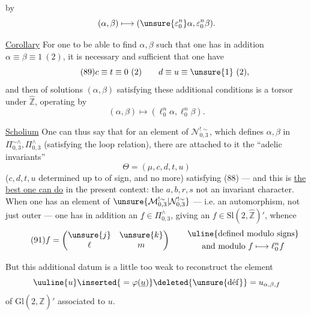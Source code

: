

by
\[
 (\alpha,\beta)\longmapsto
 (\unsure{\varepsilon_0^n}\alpha,\varepsilon_0^n\beta).
\]

\uline{Corollary} For one to be able to find $\alpha,\beta$ such that one has in addition $\alpha\equiv\beta\equiv1\ (2)$, it is necessary and sufficient that one have
\[
\tag{89}
 c\equiv t\equiv0\ (2)\qquad d\equiv u\equiv\unsure{1}\ (2),
\]
and then  of solutions $(\alpha,\beta)$ satisfying these additional conditions is a torsor under $\widehat{\mathbb Z}$, operating by
\[
 (\alpha,\beta)\longmapsto(\ell_0^n\alpha,\ell_0^n\beta).
\]

\uline{Scholium} One can thus say that for an element  of $\mathcal N_{0,3}^{!\sim}$, which defines  $\alpha,\beta$ in $\Pi_{0,3}^{\sim\wedge},\Pi_{0,3}^{\wedge}$  (satisfying the loop relation), there are attached to it the ``adelic invariants'' 
\[
\tag{90}
 \Theta=(\mu,c,d,t,u)
\]
($c,d,t,u$ determined up to  of sign, and no more) satisfying (88) --- and this is \uline{the best one can do} in the present context: the $a,b,r,s$  not an invariant character. When one has an element  of $\unsure{\mathcal M_{0,3}^{!\sim}|\mathcal N_{0,3}^{!\sim}}$ --- i.e. an  automorphism, not just outer --- one has in addition an $\underline f\in\Pi_{0,3}^{\wedge}$, giving an $f\in\mathrm{Sl}(2,\widehat{\mathbb Z})'$, whence
\[
\tag{91}
 f=\begin{pmatrix}\unsure{j}&\unsure{k}\\ \ell&m\end{pmatrix}
 \qquad\begin{gathered}\uline{\text{defined modulo signs}}\\
 \text{and modulo } f\longmapsto\ell_0^n f
 \end{gathered}
\]



But this additional datum is a little too
weak to reconstruct  the element
\[
 \uuline{u}\inserted{{}=\varphi(\underline u)}\deleted{\unsure{\mathrm{d\acute{e}f}}}
 =u_{\alpha,\beta,f}
\]
of $\mathrm{Gl}(2,\widehat{\mathbb Z})'$ associated to $u$.

